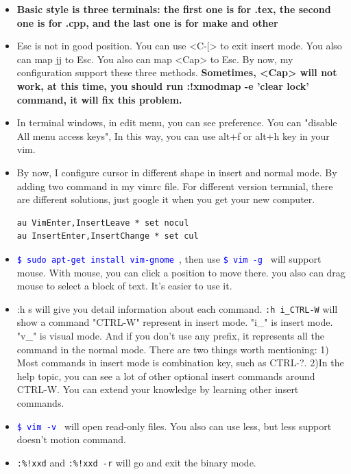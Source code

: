 \documentclass[a4paper,12pt,twoside]{book}
\newcommand{\linuxcommand}[1]{\texttt{\textcolor{blue}{\$ #1 \Pisymbol{psy}{191}}}}
\begin{document}
\begin{itemize}
		\item \textbf{Basic style is three terminals: the first one is for .tex, the second one is for .cpp, and the last one is for make and other}

		\item Esc is not in good position. You can use <C-$[$> to exit insert mode. You also can map jj to Esc. You also can map <Cap> to Esc. By now, my configuration support these three methods. \textbf{Sometimes, <Cap> will not work, at this time, you should run :!xmodmap -e 'clear lock' command, it will fix this problem.}

		\item In terminal windows, in edit menu, you can see preference. You can "disable All menu access keys", In this way, you can use alt+f or alt+h key in your vim. 

		\item By now, I configure cursor in different shape in insert and normal mode. By adding two command in my vimrc file. For different version termnial, there are different solutions, just google it when you get your new computer.
\begin{verbatim}
au VimEnter,InsertLeave * set nocul
au InsertEnter,InsertChange * set cul
\end{verbatim} 		

		\item \linuxcommand{sudo apt-get install vim-gnome}, then use \linuxcommand{vim -g} will support mouse.  With mouse, you can click a position to move there. you also can drag mouse to select a block of text. It's easier to use it.  

		\item :h s will give you detail information about each command. \verb=:h i_CTRL-W= will show a command "CTRL-W" represent in insert mode. "i\_" is insert mode. "v\_" is visual mode. And if you don't use any prefix, it represents all the command in the normal mode. There are two things worth mentioning: 1) Most commands in insert mode is combination key, such as CTRL-?. 2)In the help topic, you can see a lot of other optional insert commands around CTRL-W. You can extend your knowledge by learning other insert commands.

		\item \linuxcommand{vim -v} will open read-only files. You also can use less, but less support doesn't motion command.

		\item \verb=:%!xxd= and \verb=:%!xxd -r= will go and exit the binary mode.


\end{itemize}
\end{document}
